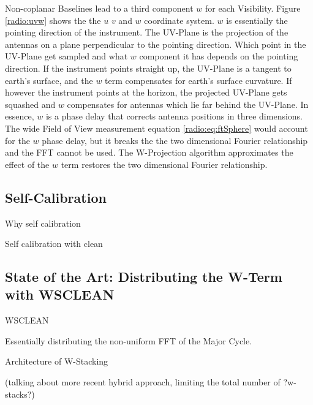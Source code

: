 Non-coplanar Baselines lead to a third component $w$ for each Visibility. Figure \ref{radio:uvw} shows the the $u$ $v$ and $w$ coordinate system. $w$ is essentially the pointing direction of the instrument. The UV-Plane is the projection of the antennas on a plane perpendicular to the pointing direction. Which point in the UV-Plane get sampled and what $w$ component it has depends on the pointing direction. If the instrument points straight up, the UV-Plane is a tangent to earth's surface, and the $w$ term compensates for earth's surface curvature. If however the instrument points at the horizon, the projected UV-Plane gets squashed and $w$ compensates for antennas which lie far behind the UV-Plane. In essence, $w$ is a phase delay that corrects antenna positions in three dimensions. The wide Field of View measurement equation \eqref{radio:eq:ftSphere} would account for the $w$ phase delay, but it breaks the the two dimensional Fourier relationship and the FFT cannot be used. The W-Projection \cite{cornwell2008noncoplanar} algorithm approximates the effect of the $w$ term restores the two dimensional Fourier relationship.


\subsection{Self-Calibration}
Why self calibration

Self calibration with clean




\subsection{State of the Art: Distributing the W-Term with WSCLEAN} 

\cite{offringa2014wsclean} WSCLEAN

Essentially distributing the non-uniform FFT of the Major Cycle.

Architecture of W-Stacking

(talking about more recent hybrid approach, limiting the total number of ?w-stacks?)






